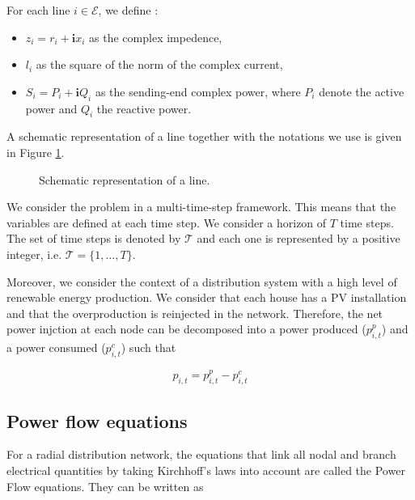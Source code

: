 For each line $i \in \mathcal{E}$, we define :
\begin{itemize}
  \item $z_i = r_i + \mathbf{i}x_i$ as the complex impedence,
  \item $l_i$ as the square of the norm of the complex current,
  \item $S_i = P_i + \mathbf{i}Q_i$ as the sending-end complex power, where $P_i$ denote the active power and $Q_i$ the reactive power.
\end{itemize}

A schematic representation of a line together with the notations we use is given in Figure \ref{fig:line}.

\begin{figure}
\centering
{}
\caption{Schematic representation of a line.}
\label{fig:line}
\end{figure}

We consider the problem in a multi-time-step framework.
This means that the variables are defined at each time step.
We consider a horizon of $T$ time steps.
The set of time steps is denoted by $\mathcal{T}$ and each one is represented by a positive integer, i.e. $\mathcal{T} = \{1, \dots, T\}$.

Moreover, we consider the context of a distribution system with a high level of renewable energy production.
We consider that each house has a PV installation and that the overproduction is reinjected in the network.
Therefore, the net power injction at each node can be decomposed into a power produced ($p_{i,t}^p$) and a power consumed ($p_{i,t}^c$) such that

$$p_{i,t} = p_{i,t}^p - p_{i,t}^c$$

\subsection{Power flow equations}

For a radial distribution network, the equations that link all nodal and branch electrical quantities by taking Kirchhoff's laws into account are called the Power Flow equations.
They can be written as


